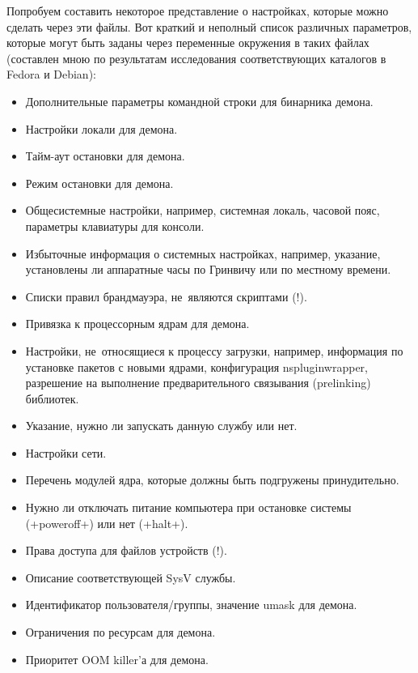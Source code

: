 \documentclass[10pt,oneside,a4paper]{article}
\begin{document}
Попробуем составить некоторое представление о настройках, которые можно сделать
через эти файлы. Вот краткий и неполный список различных параметров, которые
могут быть заданы через переменные окружения в таких файлах (составлен мною по
результатам исследования соответствующих каталогов в Fedora и Debian):
\begin{itemize}
	\item Дополнительные параметры командной строки для бинарника демона.
	\item Настройки локали для демона.
	\item Тайм-аут остановки для демона.
	\item Режим остановки для демона.
	\item Общесистемные настройки, например, системная локаль, часовой пояс,
		параметры клавиатуры для консоли.
	\item Избыточные информация о системных настройках, например, указание,
		установлены ли аппаратные часы по Гринвичу или по местному
		времени.
	\item Списки правил брандмауэра, не~являются скриптами (!).
	\item Привязка к процессорным ядрам для демона.
	\item Настройки, не~относящиеся к процессу загрузки, например,
		информация по установке пакетов с новыми ядрами, конфигурация
		nspluginwrapper, разрешение на выполнение
		предварительного связывания (prelinking) библиотек.
	\item Указание, нужно ли запускать данную службу или нет.
	\item Настройки сети.
	\item Перечень модулей ядра, которые должны быть подгружены
		принудительно.
	\item Нужно ли отключать питание компьютера при остановке системы
		(+poweroff+) или нет (+halt+).
	\item Права доступа для файлов устройств (!).
	\item Описание соответствующей SysV службы.
	\item Идентификатор пользователя/группы, значение umask для демона.
	\item Ограничения по ресурсам для демона.
	\item Приоритет OOM killer'а для демона.
\end{itemize}
\end{document}
